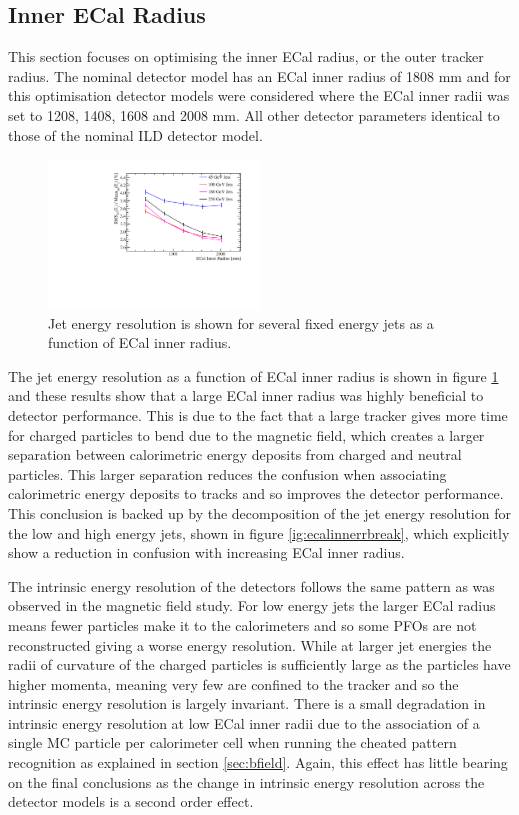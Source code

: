 \subsection{Inner ECal Radius}
This section focuses on optimising the inner ECal radius, or the outer tracker radius.  The nominal detector model has an ECal inner radius of 1808 mm and for this optimisation detector models were considered where the ECal inner radii was set to 1208, 1408, 1608 and 2008 mm.  All other detector parameters identical to those of the nominal ILD detector model.

\begin{figure}
\includegraphics[width=0.5\textwidth]{OptimisationStudies/Plots/JetEnergyResolutions/JER_vs_ECalInnerRadius.pdf}
\caption[Jet energy resolution as a function of ECal inner radius.]{Jet energy resolution is shown for several fixed energy jets as a function of ECal inner radius.}
\label{fig:ecalinnerr}
\end{figure}

The jet energy resolution as a function of ECal inner radius is shown in figure \ref{fig:ecalinnerr} and these results show that a large ECal inner radius was highly beneficial to detector performance.  This is due to the fact that a large tracker gives more time for charged particles to bend due to the magnetic field, which creates a larger separation between calorimetric energy deposits from charged and neutral particles.  This larger separation reduces the confusion when associating calorimetric energy deposits to tracks and so improves the detector performance.  This conclusion is backed up by the decomposition of the jet energy resolution for the low and high energy jets, shown in figure \ref{ig:ecalinnerrbreak}, which explicitly show a reduction in confusion with increasing ECal inner radius.  

The intrinsic energy resolution of the detectors follows the same pattern as was observed in the magnetic field study.  For low energy jets the larger ECal radius means fewer particles make it to the calorimeters and so some PFOs are not reconstructed giving a worse energy resolution.  While at larger jet energies the radii of curvature of the charged particles is sufficiently large as the particles have higher momenta, meaning very few are confined to the tracker and so the intrinsic energy resolution is largely invariant.  There is a small degradation in intrinsic energy resolution at low ECal inner radii due to the association of a single MC particle per calorimeter cell when running the cheated pattern recognition as explained in section \ref{sec:bfield}.  Again, this effect has little bearing on the final conclusions as the change in intrinsic energy resolution across the detector models is a second order effect.  

